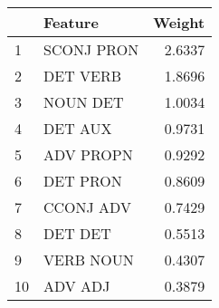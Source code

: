 \begin{tabular}{llr}
\toprule
{} &     Feature &  Weight \\
\midrule
1  &  SCONJ PRON &  2.6337 \\
2  &    DET VERB &  1.8696 \\
3  &    NOUN DET &  1.0034 \\
4  &     DET AUX &  0.9731 \\
5  &   ADV PROPN &  0.9292 \\
6  &    DET PRON &  0.8609 \\
7  &   CCONJ ADV &  0.7429 \\
8  &     DET DET &  0.5513 \\
9  &   VERB NOUN &  0.4307 \\
10 &     ADV ADJ &  0.3879 \\
\bottomrule
\end{tabular}
